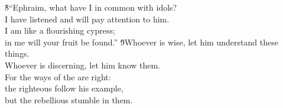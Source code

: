 \begin{poetry}
\poeml \v{8}``Ephraim, what have I in common with idols? \\
\poemll    I have listened and will pay attention to him. \\
\poeml I am like a flourishing cypress; \\
\poemll    in me will your fruit be found.''
\poeml \v{9}Whoever is wise, let him understand these things. \\
\poemll    Whoever is discerning, let him know them. \\
\poeml For the ways of the  are right: \\
\poemll    the righteous follow his example, \\
\poemlll       but the rebellious stumble in them.\end{poetry}
